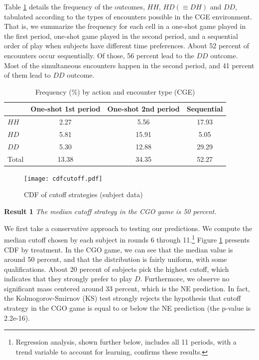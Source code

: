 \documentclass[12pt, letterpaper]{article}
\theoremstyle{plain}
\begin{document}
Table \ref{tab(CGE)} details the frequency of the outcomes, $HH$, $HD(\equiv DH)$ and $DD$, tabulated according to the types of encounters possible in the CGE environment. That is, we summarize the frequency for each cell in a one-shot game played in the first period, one-shot game played in the second period, and a sequential order of play when subjects have different time preferences. About 52 percent of encounters occur sequentially. Of those, 56 percent lead to the $DD$ outcome. Most of the simultaneous encounters happen in the second period, and 41 percent of them lead to $DD$ outcome.  \\


\begin{table}[ht]
\centering\caption{Frequency (\%) by action and encounter type (CGE)}

\begin{tabular}{lccc}
\hline
 & One-shot 1st period & One-shot 2nd period  & Sequential\\
  \hline
  $HH$ &  2.27 & 5.56 & 17.93 \\
  $HD$ & 5.81 & 15.91 & 5.05 \\
  $DD$& 5.30 & 12.88 & 29.29 \\
  \hline
Total & 13.38 & 34.35 & 52.27\\
\end{tabular}

\label{tab(CGE)}
\end{table}

\begin{center}
\begin{figure}[!ht]
\centering{}%
\texttt{[image: cdfcutoff.pdf]}%
\caption{CDF of cutoff strategies (subject data) \\ } 
\label{fig:allcutoff}
\end{figure}
\par\end{center}


\noindent \textbf{Result 1}
\textit{The median cutoff strategy in the CGO game is 50 percent.}

We first take a conservative approach to testing our predictions. We compute the median cutoff chosen by each subject in rounds 6 through 11.\footnote{Regression analysis, shown further below, includes all 11 periods, with a trend variable to account for learning, confirms these results.} Figure \ref{fig:allcutoff} presents CDF by treatment. In the CGO game, we can see that the median value is around 50 percent, and that the distribution is fairly uniform, with some qualifications. About 20 percent of subjects pick the highest cutoff, which indicates that they strongly prefer to play $D$. Furthermore, we observe no significant mass centered around 33 percent, which is the NE prediction. In fact, the Kolmogorov-Smirnov (KS) test strongly rejects the hypothesis that cutoff strategy in the CGO game is equal to or below the NE prediction (the p-value is 2.2e-16).
\end{document}
